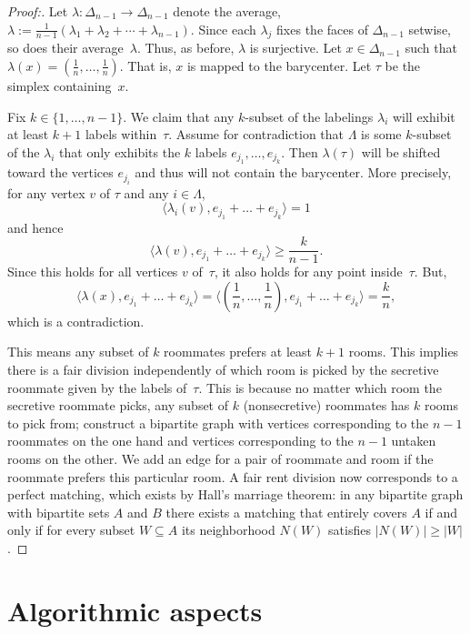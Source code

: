 \documentclass[a4paper,10pt,reqno, english]{amsart}
\theoremstyle{plain}
\theoremstyle{definition}
\begin{document}
\begin{proof}[Proof:]
	Let $\lambda\colon \Delta_{n-1} \longrightarrow \Delta_{n-1}$ denote the average, $\lambda := \frac{1}{n-1}(\lambda_1 + \lambda_2 + \cdots + \lambda_{n-1})$. 
	Since each $\lambda_j$ fixes the faces of $\Delta_{n-1}$ setwise, so does their average~$\lambda$. Thus, as before, $\lambda$ is surjective. Let $x \in \Delta_{n-1}$ such that $\lambda(x) = (\frac{1}{n}, \dots, \frac{1}{n})$. That is, $x$ is mapped to the barycenter. Let $\tau$ be the simplex containing~$x$.
	
	Fix $k \in \{1, \dots, n-1\}$. We claim that any $k$-subset of the labelings $\lambda_i$ will exhibit at least $k+1$ labels within~$\tau$. Assume for contradiction that $\Lambda$ is some $k$-subset of the $\lambda_i$ that only exhibits the $k$ labels $e_{j_1}, \dots, e_{j_k}$. Then $\lambda(\tau)$ will be shifted toward the vertices $e_{j_i}$ and thus will not contain the barycenter. More precisely, for any vertex $v$ of $\tau$ and any $i \in \Lambda$, 
	$$\langle \lambda_i(v), e_{j_1} + \dots + e_{j_k} \rangle = 1$$
	and hence
	$$\langle \lambda(v), e_{j_1} + \dots + e_{j_k} \rangle \ge \frac{k}{n-1}.$$
	Since this holds for all vertices $v$ of~$\tau$, it also holds for any point inside~$\tau$. But,
	$$\langle \lambda(x), e_{j_1} + \dots + e_{j_k} \rangle = \langle (\frac{1}{n}, \dots, \frac{1}{n}), e_{j_1} + \dots + e_{j_k} \rangle = \frac{k}{n},$$
	which is a contradiction.
	
	This means any subset of $k$ roommates prefers at least $k+1$ rooms. This implies there is a fair division independently of which room is picked by the secretive roommate given by the labels of~$\tau$. This is because no matter which room the secretive roommate picks, any subset of $k$ (nonsecretive) roommates has $k$ rooms to pick from; construct a bipartite graph with vertices corresponding to the $n-1$ roommates on the one hand and vertices corresponding to the $n-1$ untaken rooms on the other. We add an edge for a pair of roommate and room if the roommate prefers this particular room. A fair rent division now corresponds to a perfect matching, which exists by Hall's marriage theorem: in any bipartite graph with bipartite sets $A$ and $B$ there exists a matching that entirely covers $A$ if and only if for every subset $W \subseteq A$ its neighborhood $N(W)$ satisfies $|N(W)| \ge |W|$.
\end{proof}





\section{Algorithmic aspects}
\label{sec:algorithm}
\end{document}
